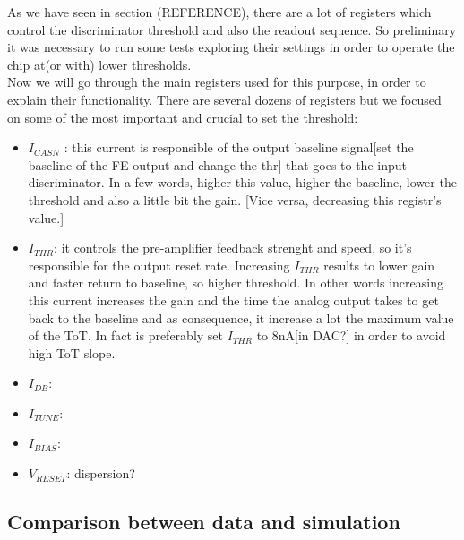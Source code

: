 As we have seen in section (REFERENCE), there are a lot of registers which control the discriminator threshold and also the readout sequence. So preliminary it was necessary to run some tests exploring their settings in order to operate the chip at(or with) lower thresholds.\\

Now we will go through the main registers used for this purpose, in order to explain their functionality. There are several dozens of registers but we focused on some of the most important and crucial to set the threshold:

\begin{itemize}
\label{currents}
\item \textit{$I_{CASN}$} : this current is responsible of the output baseline signal[set the baseline of the FE output and change the thr] that goes to the input discriminator. In a few words, higher this value, higher the baseline, lower the threshold and also a little bit the gain. [Vice versa, decreasing this registr's value.]
\item \textit{$I_{THR}$}: it controls the pre-amplifier feedback strenght and speed, so it's responsible for the output reset rate. Increasing $I_{THR}$ results to lower gain and faster return to baseline, so higher threshold. In other words increasing this current increases the gain and the time the analog output takes to get back to the baseline and as consequence, it increase a lot the maximum value of the ToT. In fact is preferably set $I_{THR}$ to 8nA[in DAC?] in order to avoid high ToT slope.
\item \textit{$I_{DB}$}: 
\item \textit{$I_{TUNE}$}:
\item \textit{$I_{BIAS}$}: 
\item \textit{$V_{RESET}$}:  dispersion?
\end{itemize}

\begin{comment}
In section (...) some improvements of the readout with respect to TJ-Monopix 1 (analogical and digital part) have been mentioned. 
\end{comment}



\subsection{Comparison between data and simulation}

